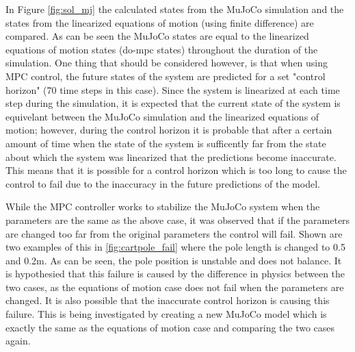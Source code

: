 \documentclass{./springer/svjour3}
\begin{document}
In Figure \ref{fig:sol_mj} the calculated states from the MuJoCo simulation and the states from the linearized equations of motion (using 
finite difference) are compared. As can be seen the MuJoCo states are equal to the linearized equations of motion states (do-mpc states) throughout the duration 
of the simulation. One thing that should be considered however, is that when using MPC control, the future states of the system are predicted for a set 
"control horizon" (70 time steps in this case). Since the system is linearized at each time step during the simulation, it is expected that the current state of the 
system is equivelant between the MuJoCo simulation and the linearized equations of motion; however, during the control horizon it is probable that after a certain amount of time 
when the state of the system is sufficently far from the state about which the system was linearized that the predictions become inaccurate. This means that it is possible 
for a control horizon which is too long to cause the control to fail due to the inaccuracy in the future predictions of the model.

While the MPC controller works to stabilize the MuJoCo system when the parameters are the same as the above case, it was observed 
that if the parameters are changed too far from the original parameters the control will fail. Shown are two examples of this in 
\ref{fig:cartpole_fail} where the pole length is changed to 0.5 and 0.2m.
As can be seen, the pole position is unstable and does not balance. It is hypothesied that 
this failure is caused by the difference in physics between the two cases, as the equations of motion case does not fail when the parameters are changed. It is also possible 
that the inaccurate control horizon is causing this failure. This is being investigated by creating a new MuJoCo model which is exactly the same as the equations of motion case 
and comparing the two cases again.
\end{document}
